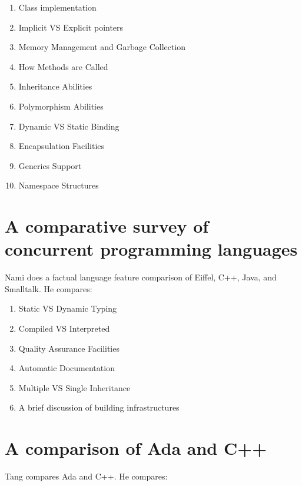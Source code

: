 \documentclass{article}
\begin{document}
\begin{enumerate}
    \item Class implementation
    \item Implicit VS Explicit pointers
    \item Memory Management and Garbage Collection
    \item How Methods are Called
    \item Inheritance Abilities
    \item Polymorphism Abilities
    \item Dynamic VS Static Binding
    \item Encapsulation Facilities
    \item Generics Support
    \item Namespace Structures
\end{enumerate}

\section{A comparative survey of concurrent programming languages}
Nami does a factual language feature comparison of Eiffel, C++, Java, and Smalltalk\cite{NamiCompOOSoftEng}.  He compares:

\begin{enumerate}
    \item Static VS Dynamic Typing
    \item Compiled VS Interpreted
    \item Quality Assurance Facilities
    \item Automatic Documentation
    \item Multiple VS Single Inheritance
    \item A brief discussion of building infrastructures
\end{enumerate}

\section{A comparison of Ada and C++}
Tang compares Ada and C++\cite{TangAdaVsCpp}.  He compares:
\end{document}
